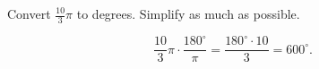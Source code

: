 Convert $\frac{10}{3}\pi$ to degrees. Simplify as much as possible.

$$
\frac{10}{3}\pi \cdot \frac{180^{\circ}}{\pi} = \frac{180^{\circ} \cdot 10}{3} = 600^{\circ}.
$$
